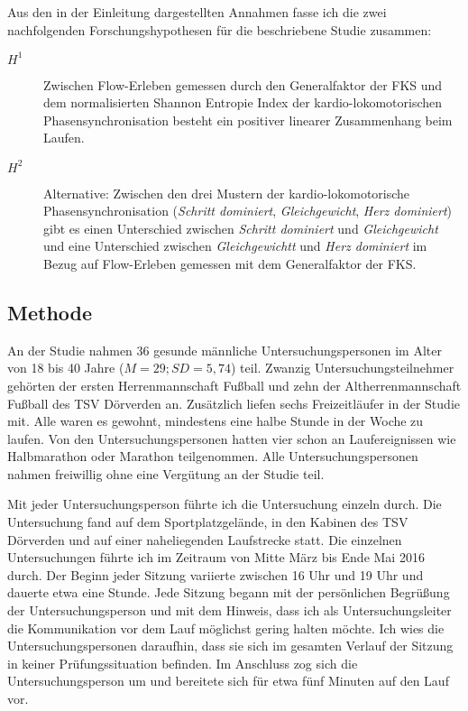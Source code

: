 Aus den in der Einleitung dargestellten Annahmen fasse ich die zwei nachfolgenden Forschungshypothesen für die beschriebene Studie zusammen: 
\begin{description}
	\item[$H^1$] Zwischen Flow-Erleben gemessen durch den Generalfaktor der \ac{FKS} und dem normalisierten Shannon Entropie Index der kardio-lokomotorischen Phasensynchronisation besteht ein positiver linearer Zusammenhang beim Laufen. 
	\item[$H^2$] Alternative: Zwischen den drei Mustern der kardio-lokomotorische Phasensynchronisation (\emph{Schritt dominiert}, \emph{Gleichgewicht}, \emph{Herz dominiert}) gibt es einen Unterschied zwischen \emph{Schritt dominiert} und \emph{Gleichgewicht} und eine Unterschied zwischen \emph{Gleichgewichtt} und \emph{Herz dominiert} im Bezug auf Flow-Erleben gemessen mit dem Generalfaktor der \ac{FKS}.
	
\end{description}

\subsection{Methode} 

\label{sub:methode_5_3}

An der Studie nahmen 36 gesunde männliche Untersuchungspersonen im Alter von 18 bis 40 Jahre ($M = 29; SD = 5{,}74$) teil. Zwanzig Untersuchungsteilnehmer gehörten der ersten Herrenmannschaft Fußball und zehn der Altherrenmannschaft Fußball des TSV Dörverden an. Zusätzlich liefen sechs Freizeitläufer in der Studie mit. Alle waren es gewohnt, mindestens eine halbe Stunde in der Woche zu laufen. Von den Untersuchungspersonen hatten vier schon an Laufereignissen wie Halbmarathon oder Marathon teilgenommen. Alle Untersuchungspersonen nahmen freiwillig ohne eine Vergütung an der Studie teil. 

Mit jeder Untersuchungsperson führte ich die Untersuchung einzeln durch. Die Untersuchung fand auf dem Sportplatzgelände, in den Kabinen des TSV Dörverden und auf einer naheliegenden Laufstrecke statt. Die einzelnen Untersuchungen führte ich im Zeitraum von Mitte März bis Ende Mai 2016 durch. Der Beginn jeder Sitzung variierte zwischen 16 Uhr und 19 Uhr und dauerte etwa eine Stunde. Jede Sitzung begann mit der persönlichen Begrüßung der Untersuchungsperson und mit dem Hinweis, dass ich als Untersuchungsleiter die Kommunikation vor dem Lauf möglichst gering halten möchte. Ich wies die Untersuchungspersonen daraufhin, dass sie sich im gesamten Verlauf der Sitzung in keiner Prüfungssituation befinden. Im Anschluss zog sich die Untersuchungsperson um und bereitete sich für etwa fünf Minuten auf den Lauf vor. 

